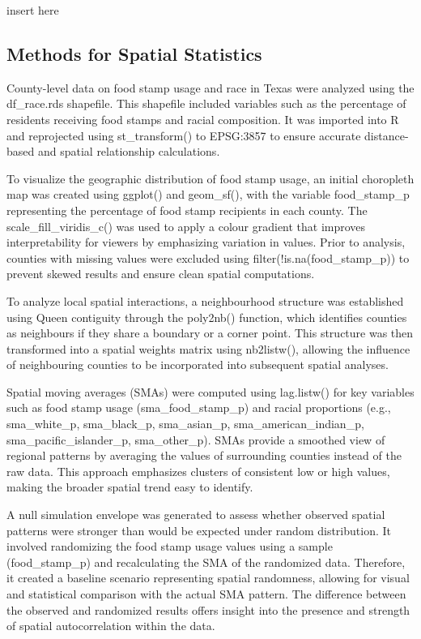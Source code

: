 \documentclass[]{article}
\begin{document}
insert here

\subsection{Methods for Spatial
Statistics}\label{methods-for-spatial-statistics}

County-level data on food stamp usage and race in Texas were analyzed
using the df\_race.rds shapefile. This shapefile included variables such
as the percentage of residents receiving food stamps and racial
composition. It was imported into R and reprojected using
st\_transform() to EPSG:3857 to ensure accurate distance-based and
spatial relationship calculations.

To visualize the geographic distribution of food stamp usage, an initial
choropleth map was created using ggplot() and geom\_sf(), with the
variable food\_stamp\_p representing the percentage of food stamp
recipients in each county. The scale\_fill\_viridis\_c() was used to
apply a colour gradient that improves interpretability for viewers by
emphasizing variation in values. Prior to analysis, counties with
missing values were excluded using filter(!is.na(food\_stamp\_p)) to
prevent skewed results and ensure clean spatial computations.

To analyze local spatial interactions, a neighbourhood structure was
established using Queen contiguity through the poly2nb() function, which
identifies counties as neighbours if they share a boundary or a corner
point. This structure was then transformed into a spatial weights matrix
using nb2listw(), allowing the influence of neighbouring counties to be
incorporated into subsequent spatial analyses.

Spatial moving averages (SMAs) were computed using lag.listw() for key
variables such as food stamp usage (sma\_food\_stamp\_p) and racial
proportions (e.g., sma\_white\_p, sma\_black\_p, sma\_asian\_p,
sma\_american\_indian\_p, sma\_pacific\_islander\_p, sma\_other\_p).
SMAs provide a smoothed view of regional patterns by averaging the
values of surrounding counties instead of the raw data. This approach
emphasizes clusters of consistent low or high values, making the broader
spatial trend easy to identify.

A null simulation envelope was generated to assess whether observed
spatial patterns were stronger than would be expected under random
distribution. It involved randomizing the food stamp usage values using
a sample (food\_stamp\_p) and recalculating the SMA of the randomized
data. Therefore, it created a baseline scenario representing spatial
randomness, allowing for visual and statistical comparison with the
actual SMA pattern. The difference between the observed and randomized
results offers insight into the presence and strength of spatial
autocorrelation within the data.
\end{document}
